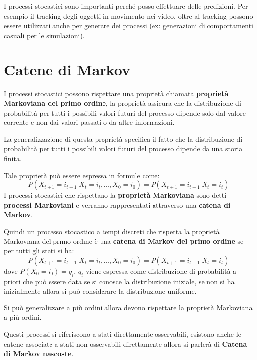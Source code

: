 I processi stocastici sono importanti perché posso effettuare delle predizioni.
Per esempio il tracking degli oggetti in movimento nei video, oltre al tracking
possono essere utilizzati anche per generare dei processi (ex: generazioni di
comportamenti casuali per le simulazioni).
\section{Catene di Markov}
I processi stocastici possono rispettare una proprietà chiamata \textbf{proprietà
    Markoviana del primo ordine}, la proprietà assicura che la distribuzione di
probabilità per tutti i possibili valori futuri del processo dipende solo dal
valore corrente e non dai valori passati o da altre informazioni.

La generalizzazione di questa proprietà specifica il fatto che la distribuzione
di probabilità per tutti i possibili valori futuri del processo dipende da una
storia finita.

Tale proprietà può essere espressa in formule come:
\begin{equation}
    P(X_{t+1} = i_{t+1 } | X_t =i_t, \dots, X_{0} = i_{0})=P(X_{t+1} = i_{t+1 } | X_t =i_t)
\end{equation}
I processi stocastici che rispettano la \textbf{proprietà Markoviana} sono detti
\textbf{processi Markoviani} e verranno rappresentati attraverso una \textbf{catena di Markov}.

Quindi un processo stocastico a tempi discreti che rispetta la proprietà Markoviana
del primo ordine è una \textbf{catena di Markov del primo ordine} se per tutti
gli stati si ha:
\begin{equation*}
    P(X_{t+1} = i_{t+1 } | X_t =i_t, \dots, X_{0} = i_{0}) = P(X_{t+1} = i_{t+1 } | X_t =i_t)
\end{equation*}
dove $P(X_0 = i_0) = q_i$, $q_i$ viene espressa come distribuzione di probabilità
a priori che può essere data se si conosce la distribuzione iniziale, se non si
ha inizialmente allora si può considerare la distribuzione uniforme.
\begin{nota}
    Si può generalizzare a più ordini allora devono rispettare la proprietà
    Markoviana a più ordini.
\end{nota}
Questi processi si riferiscono a stati direttamente osservabili, esistono anche
le catene associate a stati non osservabili direttamente allora si parlerà di
\textbf{Catena di Markov nascoste}.

